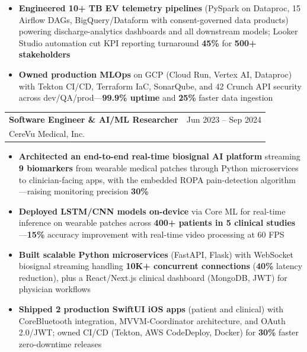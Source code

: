 \documentclass[10pt,letterpaper]{article}
\makeatletter
\newcommand{\cventry}[5]{%
  \noindent\begin{tabularx}{\textwidth}{@{}X r@{}}
    {\bfseries\color{headerblue}#2} & {\color{graytext}#1} \\
    {\color{accentcolor}#3}\enskip{\color{lightgray}#4} & \\
  \end{tabularx}%
  \vspace{0.02em}%
  #5%
  \vspace{0.14em}%
}
\makeatother
\begin{document}
{\begin{itemize}[leftmargin=0.4cm, itemsep=0.02cm, topsep=0.04cm, label={\color{goldaccent}\textbullet}]
  \item \textbf{Engineered 10+ TB EV telemetry pipelines} (PySpark on Dataproc, 15 Airflow DAGs, BigQuery/Dataform with consent-governed data products) powering discharge-analytics dashboards and all downstream models; Looker Studio automation cut KPI reporting turnaround \textbf{45\%} for \textbf{500+ stakeholders}
  \item \textbf{Owned production MLOps} on GCP (Cloud Run, Vertex AI, Dataproc) with Tekton CI/CD, Terraform IaC, SonarQube, and 42 Crunch API security across dev/QA/prod---\textbf{99.9\% uptime} and \textbf{25\%} faster data ingestion
\end{itemize}
}

\cventry{Jun 2023 -- Sep 2024}{Software Engineer \& AI/ML Researcher}{CereVu Medical, Inc.}{San Francisco Bay Area, CA}{
\begin{itemize}[leftmargin=0.4cm, itemsep=0.02cm, topsep=0.04cm, label={\color{goldaccent}\textbullet}]
  \item \textbf{Architected an end-to-end real-time biosignal AI platform} streaming \textbf{9 biomarkers} from wearable medical patches through Python microservices to clinician-facing apps, with the embedded ROPA pain-detection algorithm---raising monitoring precision \textbf{30\%}
  \item \textbf{Deployed LSTM/CNN models on-device} via Core ML for real-time inference on wearable patches across \textbf{400+ patients in 5 clinical studies}---\textbf{15\%} accuracy improvement with real-time video processing at 60 FPS
  \item \textbf{Built scalable Python microservices} (FastAPI, Flask) with WebSocket biosignal streaming handling \textbf{10K+ concurrent connections} (\textbf{40\%} latency reduction), plus a React/Next.js clinical dashboard (MongoDB, JWT) for physician workflows
  \item \textbf{Shipped 2 production SwiftUI iOS apps} (patient and clinical) with CoreBluetooth integration, MVVM-Coordinator architecture, and OAuth 2.0/JWT; owned CI/CD (Tekton, AWS CodeDeploy, Docker) for \textbf{30\%} faster zero-downtime releases
\end{itemize}
}
\end{document}
